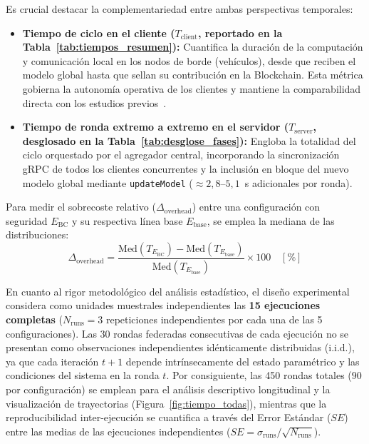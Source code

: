 Es crucial destacar la complementariedad entre ambas perspectivas temporales:
\begin{itemize}
    \item \textbf{Tiempo de ciclo en el cliente ($T_{\text{client}}$, reportado en la Tabla~\ref{tab:tiempos_resumen}):} Cuantifica la duración de la computación y comunicación local en los nodos de borde (vehículos), desde que reciben el modelo global hasta que sellan su contribución en la Blockchain. Esta métrica gobierna la autonomía operativa de los clientes y mantiene la comparabilidad directa con los estudios previos~\cite{cloudlabaia_flblockchain}.
    \item \textbf{Tiempo de ronda extremo a extremo en el servidor ($T_{\text{server}}$, desglosado en la Tabla~\ref{tab:desglose_fases}):} Engloba la totalidad del ciclo orquestado por el agregador central, incorporando la sincronización gRPC de todos los clientes concurrentes y la inclusión en bloque del nuevo modelo global mediante \texttt{updateModel} ($\approx 2{,}8\text{--}5{,}1$~s adicionales por ronda).
\end{itemize}

Para medir el sobrecoste relativo ($\Delta_{\text{overhead}}$) entre una configuración con seguridad $E_{\text{BC}}$ y su respectiva línea base $E_{\text{base}}$, se emplea la mediana de las distribuciones:
\begin{equation}
\Delta_{\text{overhead}} = \frac{\text{Med}(T_{E_{\text{BC}}}) - \text{Med}(T_{E_{\text{base}}})}{\text{Med}(T_{E_{\text{base}}})} \times 100 \quad [\%] \label{eq:overhead}
\end{equation}

En cuanto al rigor metodológico del análisis estadístico, el diseño experimental considera como unidades muestrales independientes las \textbf{15 ejecuciones completas} ($N_{\text{runs}} = 3$ repeticiones independientes por cada una de las 5 configuraciones). Las 30 rondas federadas consecutivas de cada ejecución no se presentan como observaciones independientes idénticamente distribuidas (i.i.d.), ya que cada iteración $t+1$ depende intrínsecamente del estado paramétrico y las condiciones del sistema en la ronda $t$. Por consiguiente, las 450 rondas totales ($90$ por configuración) se emplean para el análisis descriptivo longitudinal y la visualización de trayectorias (Figura~\ref{fig:tiempo_todas}), mientras que la reproducibilidad inter-ejecución se cuantifica a través del Error Estándar ($SE$) entre las medias de las ejecuciones independientes ($SE = \sigma_{\text{runs}} / \sqrt{N_{\text{runs}}}$).

